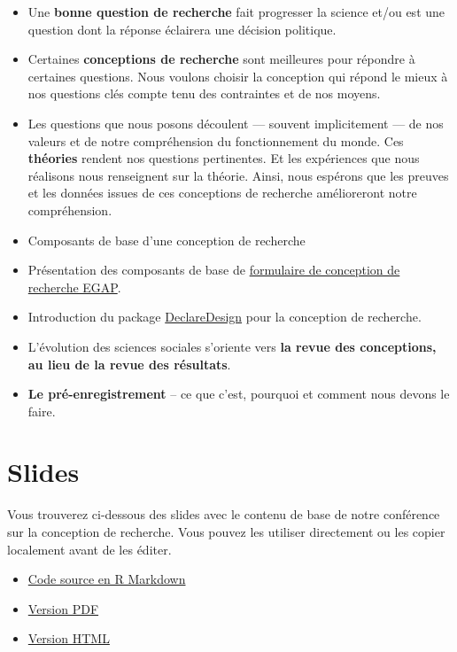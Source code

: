 \documentclass[12pt,]{book}
\begin{document}
\begin{itemize}
\item
  Une \textbf{bonne question de recherche} fait progresser la science et/ou est une question dont la réponse éclairera une décision politique.
\item
  Certaines \textbf{conceptions de recherche} sont meilleures pour répondre à certaines questions. Nous voulons choisir la conception qui répond le mieux à nos questions clés compte tenu des contraintes et de nos moyens.
\item
  Les questions que nous posons découlent --- souvent implicitement --- de nos valeurs et de notre compréhension du fonctionnement du monde. Ces \textbf{théories} rendent nos questions pertinentes. Et les expériences que nous réalisons nous renseignent sur la théorie. Ainsi, nous espérons que les preuves et les données issues de ces conceptions de recherche amélioreront notre compréhension.
\item
  Composants de base d'une conception de recherche
\item
  Présentation des composants de base de \href{https://egap.github.io/learningdays-resources/Exercises/design-form.html}{formulaire de conception de recherche EGAP}.
\item
  Introduction du package \href{https://declaredesign.org}{DeclareDesign} pour la conception de recherche.
\item
  L'évolution des sciences sociales s'oriente vers \textbf{la revue des conceptions, au lieu de la revue des résultats}.
\item
  \textbf{Le pré-enregistrement} -- ce que c'est, pourquoi et comment nous devons le faire.
\end{itemize}

\hypertarget{slides}{%
\section{Slides}\label{slides}}

Vous trouverez ci-dessous des slides avec le contenu de base de notre conférence sur la conception de recherche. Vous pouvez les utiliser directement ou les copier localement avant de les éditer.

\begin{itemize}
\item
  \href{https://egap.github.io/learningdays-resources/Slides_fr/researchdesignform-slides.Rmd}{Code source en R Markdown}
\item
  \href{https://egap.github.io/learningdays-resources/Slides_fr/researchdesignform-slides.pdf}{Version PDF}
\item
  \href{https://egap.github.io/learningdays-resources/Slides_fr/researchdesignform-slides.html}{Version HTML}
\end{itemize}
\end{document}

